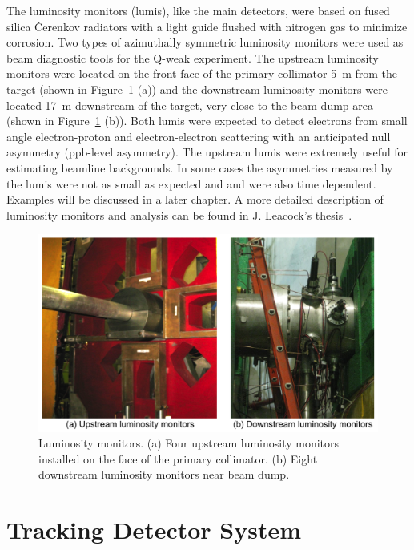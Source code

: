 The luminosity monitors (lumis), like the main detectors, were based on fused silica \v{C}erenkov radiators with a light guide flushed with nitrogen gas to minimize corrosion. Two types of azimuthally symmetric luminosity monitors were used as beam diagnostic tools for the Q-weak experiment. The upstream luminosity monitors were located on the front face of the primary collimator 5~m from the target (shown in Figure~\ref{fig:lumi} (a)) and the downstream luminosity monitors were located 17~m downstream of the target, very close to the beam dump area (shown in Figure~\ref{fig:lumi} (b)). Both lumis were expected to detect electrons from small angle electron-proton and electron-electron scattering with an anticipated null asymmetry (ppb-level asymmetry). The upstream lumis were extremely useful for estimating beamline backgrounds. In some cases the asymmetries measured by the lumis were not as small as expected and and were also time dependent. Examples will be discussed in a later chapter.  A more detailed description of luminosity monitors and analysis can be found in J. Leacock's thesis~\cite{leacock_qweak}.


\begin{singlespace}
\begin{figure}[!h]
	\begin{center}
	\includegraphics[width=15.0cm]{figures/lumi}
	\caption
	{Luminosity monitors. (a) Four upstream luminosity monitors installed on the face of the primary collimator. (b) Eight downstream luminosity monitors near beam dump.}
	\label{fig:lumi}
	\end{center}
\end{figure}
\end{singlespace}


\section{Tracking Detector System}%
\label{Tracking Detector System}

